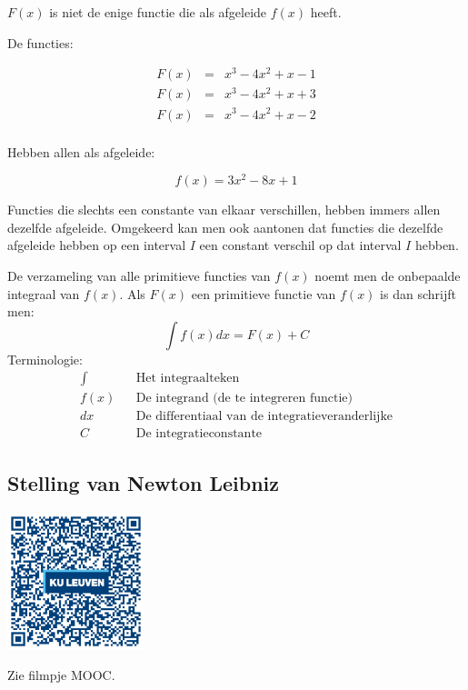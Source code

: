 $F(x)$ is niet de enige functie die als afgeleide $f(x)$ heeft.

De functies:

\begin{eqnarray*}
F(x) &=& x^3-4x^2+x-1 \\
F(x) &=& x^3-4x^2+x+3 \\
F(x) &=& x^3-4x^2+x-2 \\
\end{eqnarray*}

Hebben allen als afgeleide:

\begin{equation*}
f(x) = 3x^2-8x+1
\end{equation*}

Functies die slechts een constante van elkaar verschillen, hebben immers allen dezelfde afgeleide. Omgekeerd kan men ook aantonen dat functies die dezelfde afgeleide hebben op een interval $I$ een constant verschil op dat interval $I$ hebben.

\begin{definitie}
De verzameling van alle primitieve functies van $f(x)$ noemt men de onbepaalde integraal van $f(x)$. 
Als $F(x)$ een primitieve functie van $f(x)$ is dan schrijft men:
\begin{equation*}
\int f(x)dx = F(x) + C
\end{equation*}
Terminologie:
\begin{eqnarray*}
\int && \text{Het integraalteken} \\
f(x) && \text{De integrand (de te integreren functie)} \\
dx && \text{De differentiaal van de integratieveranderlijke} \\
C && \text{De integratieconstante }
\end{eqnarray*}
\end{definitie}

\subsection{Stelling van Newton Leibniz}
\begin{minipage}{.25\linewidth}
	\raggedright
	\includegraphics[width=4cm]{6_afgeleiden_integralen/inputs/QR_Code_STNEWTONLEIBNIZ_module6_2new}
\end{minipage}
\begin{minipage}{.7\linewidth}
	Zie filmpje MOOC.
\end{minipage}

